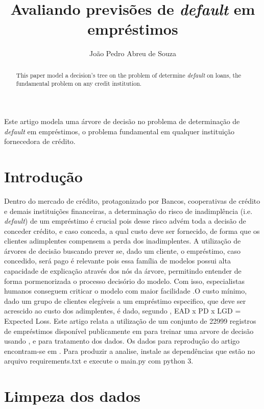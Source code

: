 \documentclass[12pt]{article}
\title{Avaliando previsões de \textit{default} em empréstimos}
\author{João Pedro Abreu de Souza\inst{1}}
\begin{document}
 

\maketitle

\begin{abstract}
  This paper model a decision's tree on the problem of determine \textit{default} on loans, the fundamental problem on any credit institution.
\end{abstract}
     
\begin{resumo} 
  Este artigo modela uma árvore de decisão no problema de determinação de \textit{default} em empréstimos, o problema fundamental em qualquer instituição fornecedora de crédito.
  
\end{resumo}


\section{Introdução}

Dentro do mercado de crédito, protagonizado por Bancos, cooperativas de crédito e demais instituições financeiras, a determinação do risco de inadimplência (i.e. \textit{default}) de um empréstimo é crucial pois desse risco advém toda a decisão de conceder crédito, e caso conceda, a qual custo deve ser fornecido, de forma que os clientes adimplentes compensem a perda dos inadimplentes. A utilização de árvores de decisão buscando prever se, dado um cliente, o empréstimo, caso concedido, será pago é relevante pois essa família de modelos possui alta capacidade de explicação através dos nós da árvore, permitindo entender de forma pormenorizada o processo decisório do modelo. Com isso, especialistas humanos conseguem criticar o modelo com maior facilidade .O custo mínimo, dado um grupo de clientes elegíveis a um empréstimo especifico, que deve ser acrescido ao custo dos adimplentes, é dado, segundo \cite{investopedia}, EAD x PD x LGD = Expected Loss. Este artigo relata a utilização de um conjunto de 22999 registros de empréstimos disponível publicamente em \cite{kaggle} para treinar uma arvore de decisão usando \cite{scikit}, \cite{pandas} e \cite{numpy} para tratamento dos dados. Os dados para reprodução do artigo encontram-se em \cite{repositorio}. Para produzir a analise, instale as dependências que estão no arquivo requirements.txt e execute o main.py com python 3.

\section{Limpeza dos dados} \label{sec:firstpage}
\end{document}

